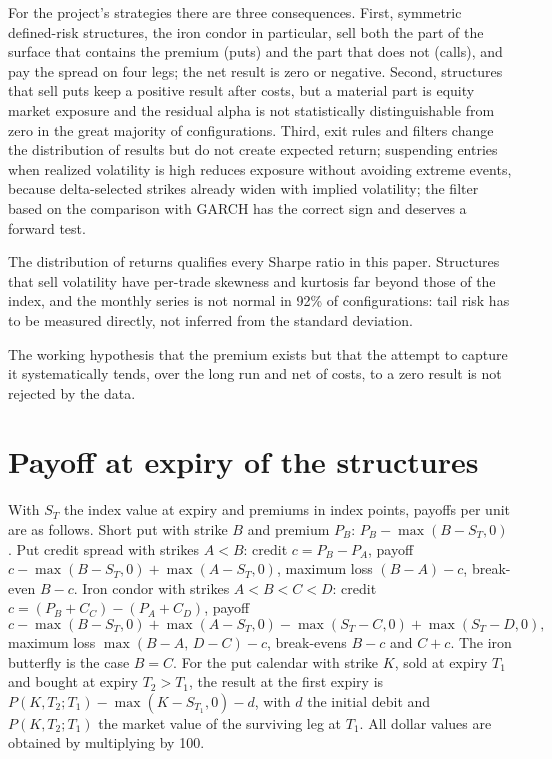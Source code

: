 \documentclass[11pt,a4paper]{article}
\begin{document}
For the project's strategies there are three consequences. First, symmetric defined-risk structures, the iron condor in particular, sell both the part of the surface that contains the premium (puts) and the part that does not (calls), and pay the spread on four legs; the net result is zero or negative. Second, structures that sell puts keep a positive result after costs, but a material part is equity market exposure and the residual alpha is not statistically distinguishable from zero in the great majority of configurations. Third, exit rules and filters change the distribution of results but do not create expected return; suspending entries when realized volatility is high reduces exposure without avoiding extreme events, because delta-selected strikes already widen with implied volatility; the filter based on the comparison with GARCH has the correct sign and deserves a forward test.

The distribution of returns qualifies every Sharpe ratio in this paper. Structures that sell volatility have per-trade skewness and kurtosis far beyond those of the index, and the monthly series is not normal in 92\% of configurations: tail risk has to be measured directly, not inferred from the standard deviation.

The working hypothesis that the premium exists but that the attempt to capture it systematically tends, over the long run and net of costs, to a zero result is not rejected by the data.

\appendix
\section{Payoff at expiry of the structures}\label{app:payoff}

With $S_T$ the index value at expiry and premiums in index points, payoffs per unit are as follows. Short put with strike $B$ and premium $P_B$: $P_B - \max(B-S_T,0)$. Put credit spread with strikes $A<B$: credit $c=P_B-P_A$, payoff $c - \max(B-S_T,0) + \max(A-S_T,0)$, maximum loss $(B-A)-c$, break-even $B-c$. Iron condor with strikes $A<B<C<D$: credit $c=(P_B+C_C)-(P_A+C_D)$, payoff
\[
c - \max(B-S_T,0) + \max(A-S_T,0) - \max(S_T-C,0) + \max(S_T-D,0),
\]
maximum loss $\max(B-A,\,D-C)-c$, break-evens $B-c$ and $C+c$. The iron butterfly is the case $B=C$. For the put calendar with strike $K$, sold at expiry $T_1$ and bought at expiry $T_2>T_1$, the result at the first expiry is $P(K,T_2;T_1) - \max(K-S_{T_1},0) - d$, with $d$ the initial debit and $P(K,T_2;T_1)$ the market value of the surviving leg at $T_1$. All dollar values are obtained by multiplying by 100.
\end{document}
